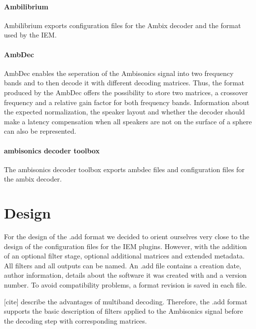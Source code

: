 \documentclass[a4paper, 10pt, twocolumn]{article}
\begin{document}
\paragraph{Ambilibrium}

Ambilibrium \cite{romanov2018ambilibrium} exports configuration files for the Ambix decoder and the format used by the IEM.

\paragraph{AmbDec}

AmbDec enables the seperation of the Ambisonics signal into two frequency bands and to then decode it with different decoding matrices. Thus, the format produced by the AmbDec offers the possibility to store two matrices, a crossover frequency and a relative gain factor for both frequency bands. Information about the expected normalization, the speaker layout and whether the decoder should make a latency compensation when all speakers are not on the surface of a sphere can also be represented.\cite{AmbDecManual}

\paragraph{ambisonics decoder toolbox}

The ambisonics decoder toolbox exports ambdec files and configuration files for the ambix decoder. \cite{adtpaper} 


\section{Design} \label{sec:Design}

For the design of the .add format we decided to orient ourselves very close to the design of the configuration files for the IEM plugins. However, with the addition of an optional filter stage, optional additional matrices and extended metadata. All filters and all outputs can be named. An .add file contains a creation date, author information, details about the software it was created with and a version number. To avoid compatibility problems, a format revision is saved in each file. 

[cite] describe the advantages of multiband decoding. Therefore, the .add format supports the basic description of filters applied to the Ambisonics signal before the decoding step with corresponding matrices.
\end{document}
